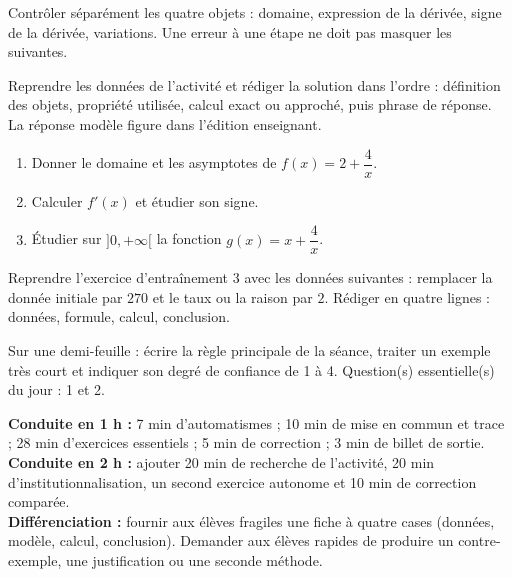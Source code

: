 \begin{traceecrite}Contrôler séparément les quatre objets : domaine, expression de la dérivée, signe de la dérivée, variations. Une erreur à une étape ne doit pas masquer les suivantes.\end{traceecrite}

\begin{exemple}
Reprendre les données de l'activité et rédiger la solution dans l'ordre : définition des objets, propriété utilisée, calcul exact ou approché, puis phrase de réponse. La réponse modèle figure dans l'édition enseignant.
\end{exemple}

\begin{exercice}[-- essentiel]
\begin{enumerate}\item Donner le domaine et les asymptotes de $f(x)=2+\dfrac{4}x$.\item Calculer $f'(x)$ et étudier son signe.\item Étudier sur $]0,+\infty[$ la fonction $g(x)=x+\dfrac{4}x$.\end{enumerate}
\end{exercice}


\begin{dm}Reprendre l'exercice d'entraînement 3 avec les données suivantes : remplacer la donnée initiale par $270$ et le taux ou la raison par $2$. Rédiger en quatre lignes : données, formule, calcul, conclusion.\end{dm}

\begin{sortie}Sur une demi-feuille : écrire la règle principale de la séance, traiter un exemple très court et indiquer son degré de confiance de 1 à 4. Question(s) essentielle(s) du jour : 1 et 2.\end{sortie}

\ifprof
\begin{methode}
\textbf{Conduite en 1 h :} 7 min d'automatismes ; 10 min de mise en commun et trace ; 28 min d'exercices essentiels ; 5 min de correction ; 3 min de billet de sortie.\\
\textbf{Conduite en 2 h :} ajouter 20 min de recherche de l'activité, 20 min d'institutionnalisation, un second exercice autonome et 10 min de correction comparée.\\
\textbf{Différenciation :} fournir aux élèves fragiles une fiche à quatre cases (données, modèle, calcul, conclusion). Demander aux élèves rapides de produire un contre-exemple, une justification ou une seconde méthode.
\end{methode}
\fi
